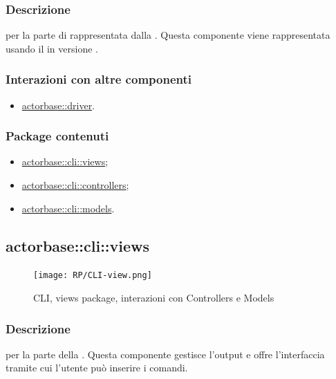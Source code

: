 \documentclass{scalatekids-article}
\begin{document}
\subsubsection{Descrizione}

 per la parte di  rappresentata dalla .
Questa componente viene rappresentata usando il 
 in versione .

\subsubsection{Interazioni con altre componenti}

\begin{itemize}
	\item \hyperref[sec:actorbase::driver]{actorbase::driver}.
\end{itemize}

\subsubsection{Package contenuti}

\begin{itemize}
	\item \hyperref[sec:actorbase::cli::views]{actorbase::cli::views};
	\item \hyperref[sec:actorbase::cli::controllers]{actorbase::cli::controllers};
	\item \hyperref[sec:actorbase::cli::models]{actorbase::cli::models}.
\end{itemize}

\subsection{actorbase::cli::views}
\label{sec:actorbase::cli::views}

\begin{figure}[H]
	\begin{center}
		\texttt{[image: RP/CLI-view.png]}
		\caption{CLI, views package, interazioni con Controllers e Models}
	\end{center}
\end{figure}

\subsubsection{Descrizione}

 per la parte  della . Questa componente
gestisce l'output e offre l'interfaccia tramite cui l'utente può inserire i
comandi.
\end{document}

